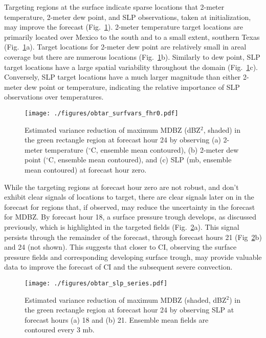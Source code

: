 \documentclass{ttuthes2007}
\newcommand{\tab}{\hspace*{2em}}  %
\begin{document}
\tab Targeting regions at the surface indicate sparse locations that 2-meter temperature, 2-meter dew point, and SLP observations, taken at initialization, may improve the forecast (Fig.~\ref{obtar_surfvars_fhr0}). 2-meter temperature target locations are primarily located over Mexico to the south and to a small extent, southern Texas (Fig.~\ref{obtar_surfvars_fhr0}a). Target locations for 2-meter dew point are relatively small in areal coverage but there are numerous locations (Fig.~\ref{obtar_surfvars_fhr0}b). Similarly to dew point, SLP target locations have a large spatial variability throughout the domain (Fig.~\ref{obtar_surfvars_fhr0}c). Conversely, SLP target locations have a much larger magnitude than either 2-meter dew point or temperature, indicating the relative importance of SLP observations over temperatures.   

\begin{figure}[!tb]
  \centering
  \noindent\texttt{[image: ./figures/obtar\_surfvars\_fhr0.pdf]}\\
  \caption{Estimated variance reduction of maximum MDBZ (dBZ${}^2$, shaded) in the green rectangle region at forecast hour 24 by observing (a) 2-meter temperature (${}^{\circ}$C, ensemble mean contoured), (b) 2-meter dew point (${}^{\circ}$C, ensemble mean contoured), and (c) SLP (mb, ensemble mean contoured) at forecast hour zero.} 
\label{obtar_surfvars_fhr0}
\end{figure}

\tab While the targeting regions at forecast hour zero are not robust, and don't exhibit clear signals of locations to target, there are clear signals later on in the forecast for regions that, if observed, may reduce the uncertainty in the forecast for MDBZ. By forecast hour 18, a surface pressure trough develops, as discussed previously, which is highlighted in the targeted fields (Fig.~\ref{obtar_slp_series}a). This signal persists through the remainder of the forecast, through forecast hours 21 (Fig~\ref{obtar_slp_series}b) and 24 (not shown). This suggests that closer to CI, observing the surface pressure fields and corresponding developing surface trough, may provide valuable data to improve the forecast of CI and the subsequent severe convection. 

\begin{figure}[!tb]
  \centering
  \noindent\texttt{[image: ./figures/obtar\_slp\_series.pdf]}\\
  \caption{Estimated variance reduction of maximum MDBZ (shaded, dBZ${}^2$) in the green rectangle region at forecast hour 24 by observing SLP at forecast hours (a) 18 and (b) 21. Ensemble mean fields are contoured every 3 mb.}
\label{obtar_slp_series}
\end{figure}
\end{document}
